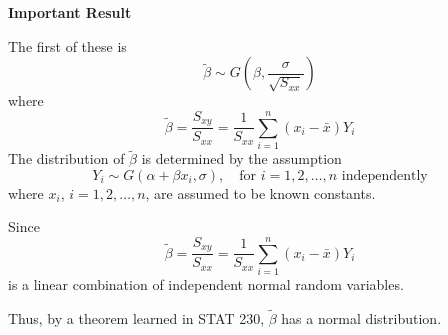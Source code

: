 \textbf{Important Result}

The first of these is
\[\tilde{\beta} \sim G\left(\beta, \frac{\sigma}{\sqrt{S_{x x}}}\right)\]
where
\[\tilde{\beta}=\frac{S_{x y}}{S_{x x}}=\frac{1}{S_{x x}} \sum_{i=1}^{n}\left(x_{i}-\bar{x}\right) Y_{i}\]
The distribution of $ \tilde{\beta} $ is determined by the assumption
\[Y_{i} \sim G\left(\alpha+\beta x_{i}, \sigma\right), \quad \text{for } i=1,2, \dots, n \text{ independently}\]
where $ x_i $, $ i=1,2,\ldots ,n $, are assumed to be known constants.

Since
\[\tilde{\beta}=\frac{S_{x y}}{S_{x x}}=\frac{1}{S_{x x}} \sum_{i=1}^{n}\left(x_{i}-\bar{x}\right) Y_{i}\]
is a linear combination of independent normal random variables.

Thus, by a theorem learned in STAT 230, $ \tilde{\beta} $ has a normal distribution.

